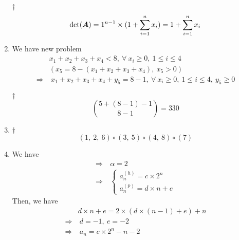 \documentclass[a4paper,12pt]{article}
\begin{document}
\begin{enumerate}
\begin{answer}{$\dag$}
\begin{equation}
            \det(\boldsymbol{A}) = 1^{n - 1} \times (1 + \sum_{i = 1}^{n}x_i) = 1 + \sum_{i = 1}^{n}x_i
        \end{equation}        
    \end{answer}
    \item We have new problem \begin{equation}
        \begin{aligned}
            & x_1 + x_2 + x_3 + x_4 < 8, \ \forall \ x_i \ge 0, \ 1 \le i \le 4 \\
            & (x_5 = 8 - (x_1 + x_2 + x_3 + x_4), \ x_5 > 0) \\
            \Rightarrow & \ x_1 + x_2 + x_3 + x_4 + y_5 = 8 - 1, \ \forall \ x_i \ge 0, \ 1 \le i \le 4, \ y_5 \ge 0 
        \end{aligned}
    \end{equation}
    \begin{answer}{$\dag$}\begin{equation}
            \binom{5 + (8 - 1) - 1}{8 - 1} = 330      
        \end{equation}
    \end{answer}
    \item \begin{answer}{$\dag$}\begin{equation}
            (1, \ 2, \ 6) \circ (3, \ 5) \circ (4, \ 8) \circ (7)            
        \end{equation}
    \end{answer}
    \item We have \begin{equation}
        \begin{aligned}
            \Rightarrow & \ \alpha = 2 \\
            \Rightarrow & \ \begin{cases}
                a_n^{(h)} = c \times 2^n \\
                a_n^{(p)} = d \times n + e
            \end{cases}
        \end{aligned}
    \end{equation} Then, we have \begin{equation}
        \begin{aligned}
            & d \times n + e = 2 \times (d \times (n - 1) + e) + n \\
            \Rightarrow & \ d = -1, \ e = -2 \\
            \Rightarrow & \ a_n = c \times 2^n - n - 2
        \end{aligned}

\end{equation}
\end{enumerate}
\end{document}
